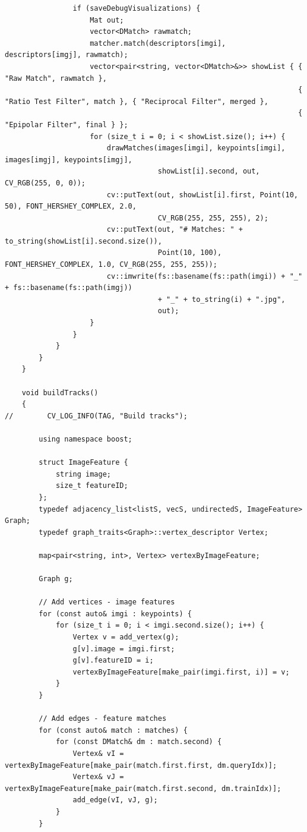 \documentclass[a4paper, 12pt]{article}
\begin{document}
\begin{lstlisting}
                if (saveDebugVisualizations) {
                    Mat out;
                    vector<DMatch> rawmatch;
                    matcher.match(descriptors[imgi], descriptors[imgj], rawmatch);
                    vector<pair<string, vector<DMatch>&>> showList { { "Raw Match", rawmatch },
                                                                     { "Ratio Test Filter", match }, { "Reciprocal Filter", merged },
                                                                     { "Epipolar Filter", final } };
                    for (size_t i = 0; i < showList.size(); i++) {
                        drawMatches(images[imgi], keypoints[imgi], images[imgj], keypoints[imgj],
                                    showList[i].second, out, CV_RGB(255, 0, 0));
                        cv::putText(out, showList[i].first, Point(10, 50), FONT_HERSHEY_COMPLEX, 2.0,
                                    CV_RGB(255, 255, 255), 2);
                        cv::putText(out, "# Matches: " + to_string(showList[i].second.size()),
                                    Point(10, 100), FONT_HERSHEY_COMPLEX, 1.0, CV_RGB(255, 255, 255));
                        cv::imwrite(fs::basename(fs::path(imgi)) + "_" + fs::basename(fs::path(imgj))
                                    + "_" + to_string(i) + ".jpg",
                                    out);
                    }
                }
            }
        }
    }

    void buildTracks()
    {
//        CV_LOG_INFO(TAG, "Build tracks");

        using namespace boost;

        struct ImageFeature {
            string image;
            size_t featureID;
        };
        typedef adjacency_list<listS, vecS, undirectedS, ImageFeature> Graph;
        typedef graph_traits<Graph>::vertex_descriptor Vertex;

        map<pair<string, int>, Vertex> vertexByImageFeature;

        Graph g;

        // Add vertices - image features
        for (const auto& imgi : keypoints) {
            for (size_t i = 0; i < imgi.second.size(); i++) {
                Vertex v = add_vertex(g);
                g[v].image = imgi.first;
                g[v].featureID = i;
                vertexByImageFeature[make_pair(imgi.first, i)] = v;
            }
        }

        // Add edges - feature matches
        for (const auto& match : matches) {
            for (const DMatch& dm : match.second) {
                Vertex& vI = vertexByImageFeature[make_pair(match.first.first, dm.queryIdx)];
                Vertex& vJ = vertexByImageFeature[make_pair(match.first.second, dm.trainIdx)];
                add_edge(vI, vJ, g);
            }
        }


\end{lstlisting}
\end{document}
